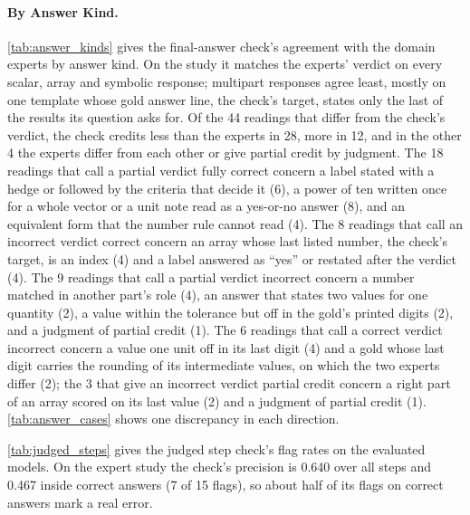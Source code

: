 \paragraph{By Answer Kind.} \autoref{tab:answer_kinds} gives the final-answer check's agreement with
the domain experts by answer kind.
On the study it matches the experts' verdict on every scalar, array and symbolic response; multipart
responses agree least, mostly on one template whose gold answer line, the check's target, states
only the last of the results its question asks for.
Of the 44 readings that differ from the check's verdict, the check credits less than the experts in
28, more in 12, and in the other 4 the experts differ from each other or give partial credit by
judgment.
The 18 readings that call a partial verdict fully correct concern a label stated with a hedge or
followed by the criteria that decide it (6), a power of ten written once for a whole vector or a
unit note read as a yes-or-no answer (8), and an equivalent form that the number rule cannot read
(4).
The 8 readings that call an incorrect verdict correct concern an array whose last listed number, the
check's target, is an index (4) and a label answered as ``yes'' or restated after the verdict (4).
The 9 readings that call a partial verdict incorrect concern a number matched in another part's role
(4), an answer that states two values for one quantity (2), a value within the tolerance but off in
the gold's printed digits (2), and a judgment of partial credit (1).
The 6 readings that call a correct verdict incorrect concern a value one unit off in its last digit
(4) and a gold whose last digit carries the rounding of its intermediate values, on which the two
experts differ (2); the 3 that give an incorrect verdict partial credit concern a right part of an
array scored on its last value (2) and a judgment of partial credit (1).
\autoref{tab:answer_cases} shows one discrepancy in each direction.



\autoref{tab:judged_steps} gives the judged step check's flag rates on the evaluated models.
On the expert study the check's precision is 0.640 over all steps and 0.467 inside correct answers
(7 of 15 flags), so about half of its flags on correct answers mark a real error.
